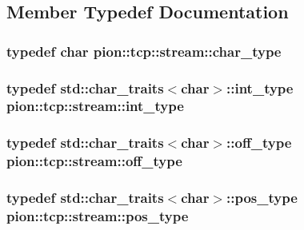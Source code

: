 \subsection{Member Typedef Documentation}
\hypertarget{classpion_1_1tcp_1_1stream_a7a1f84f71957c4d181b3956544bed706}{
\subsubsection[{char\-\_\-type}]{\setlength{\rightskip}{0pt plus 5cm}typedef char {\bf pion\-::tcp\-::stream\-::char\-\_\-type}}}\label{classpion_1_1tcp_1_1stream_a7a1f84f71957c4d181b3956544bed706}
\hypertarget{classpion_1_1tcp_1_1stream_a226831f2baafb1ad65259fc6c9bb511a}{
\subsubsection[{int\-\_\-type}]{\setlength{\rightskip}{0pt plus 5cm}typedef std\-::char\-\_\-traits$<$char$>$\-::{\bf int\-\_\-type} {\bf pion\-::tcp\-::stream\-::int\-\_\-type}}}\label{classpion_1_1tcp_1_1stream_a226831f2baafb1ad65259fc6c9bb511a}
\hypertarget{classpion_1_1tcp_1_1stream_a035e53a0425f0f05a3c3fd6c9c8be55d}{
\subsubsection[{off\-\_\-type}]{\setlength{\rightskip}{0pt plus 5cm}typedef std\-::char\-\_\-traits$<$char$>$\-::{\bf off\-\_\-type} {\bf pion\-::tcp\-::stream\-::off\-\_\-type}}}\label{classpion_1_1tcp_1_1stream_a035e53a0425f0f05a3c3fd6c9c8be55d}
\hypertarget{classpion_1_1tcp_1_1stream_a9a325595e421119b0e6e6b5972863d98}{
\subsubsection[{pos\-\_\-type}]{\setlength{\rightskip}{0pt plus 5cm}typedef std\-::char\-\_\-traits$<$char$>$\-::{\bf pos\-\_\-type} {\bf pion\-::tcp\-::stream\-::pos\-\_\-type}}}\label{classpion_1_1tcp_1_1stream_a9a325595e421119b0e6e6b5972863d98}
